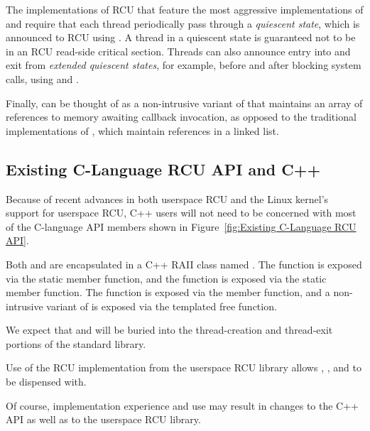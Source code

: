 \documentclass[letterpaper,10pt]{article}
\begin{document}
The implementations of RCU that feature the most aggressive implementations of
 and  require that each thread
periodically pass through a \emph{quiescent state}, which is announced to RCU
using .
A thread in a quiescent state is guaranteed not to be in an RCU
read-side critical section.
Threads can also announce entry into and exit from \emph{extended
quiescent states}, for example, before and after blocking system
calls, using  and .

Finally,  can be thought of as a non-intrusive
variant of  that maintains an array of references
to memory awaiting callback invocation, as opposed to the traditional
implementations of , which maintain references in a
linked list.

\subsection{Existing C-Language RCU API and C++}
\label{sec:Existing C-Language RCU API and C++}

Because of recent advances in both userspace RCU and the Linux kernel's
support for userspace RCU, C++ users will not need to be concerned
with most of the C-language API members shown in
Figure~\ref{fig:Existing C-Language RCU API}.

Both  and  are encapsulated
in a C++ RAII class named .
The  function is exposed via the
 static member function, and
the  function is exposed via the
 static member function.
The  function is exposed via the
 member function,
and a non-intrusive variant of  is exposed via the
 templated free function.

We expect that  and 
will be buried into the thread-creation and thread-exit portions of the
standard library.

Use of the  RCU implementation from the userspace
RCU library allows , ,
and  to be dispensed with.

Of course, implementation experience and use may result in changes
to the C++ API as well as to the userspace RCU library.
\end{document}
